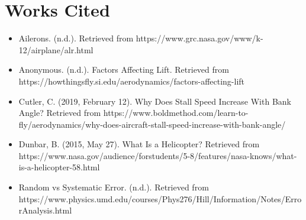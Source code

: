 \documentclass[]{article}
\theoremstyle{definition}
\begin{document}
\newpage

\section{Works Cited}

\begin{itemize}
    \item Ailerons. (n.d.). Retrieved from https://www.grc.nasa.gov/www/k-12/airplane/alr.html
    \item Anonymous. (n.d.). Factors Affecting Lift. Retrieved from https://howthingsfly.si.edu/aerodynamics/factors-affecting-lift
    \item Cutler, C. (2019, February 12). Why Does Stall Speed Increase With Bank Angle? Retrieved from https://www.boldmethod.com/learn-to-fly/aerodynamics/why-does-aircraft-stall-speed-increase-with-bank-angle/
    \item Dunbar, B. (2015, May 27). What Is a Helicopter? Retrieved from https://www.nasa.gov/audience/forstudents/5-8/features/nasa-knows/what-is-a-helicopter-58.html
    \item Random vs Systematic Error. (n.d.). Retrieved from https://www.physics.umd.edu/courses/Phys276/Hill/Information/Notes/ErrorAnalysis.html
\end{itemize}
\end{document}
